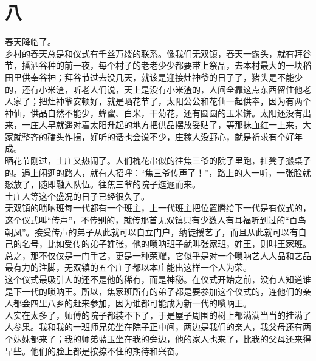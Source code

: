 \fancyhead[RO]{\thepage} %
\fancyhead[LE]{\thepage} %
\fancyfoot[LE,RO]{}
\fancyfoot[LO,CE]{}
\fancyfoot[CO,RE]{}
\chapter*{八}
春天降临了。\\

乡村的春天总是和仪式有千丝万缕的联系。像我们无双镇，春天一露头，就有拜谷节，播洒谷种的前一夜，每个村子的老老少少都要带上祭品，去本村最大的一块稻田里供奉谷神；拜谷节过去没几天，就该是迎接灶神爷的日子了，猪头是不能少的，还有小米渣，听老人们说，天上是没有小米渣的，人间全靠这点东西留住他老人家了；把灶神爷安顿好，就是晒花节了，太阳公公和花仙一起供奉，因为有两个神仙，供品自然不能少，蜂蜜、白米，干菊花，还有圆圆的玉米饼。太阳还没有出来，一庄人早就遥对着太阳升起的地方把供品摆放妥贴了，等那抹血红一上来，大家就整齐的磕头作揖，好听的话也会说不少，庄稼人没野心，就是祈求有个好年成。\\

晒花节刚过，土庄又热闹了。人们槐花串似的往焦三爷的院子里跑，扛凳子搬桌子的。遇上闲逛的路人，就有人招呼：“焦三爷传声了！”，路上的人一听，一张脸就怒放了，随即融入队伍。往焦三爷的院子迤逦而来。\\

土庄人等这个盛况的日子已经很久了。\\

无双镇的唢呐班每一代都有一个班主，上一代班主把位置腾给下一代是有仪式的，这个仪式叫“传声”，不传别的，就传那首无双镇只有少数人有耳福听到过的“百鸟朝凤”。接受传声的弟子从此就可以自立门户，纳徒授艺了，而且从此就可以有自己的名号，比如受传的弟子姓张，他的唢呐班子就叫张家班，姓王，则叫王家班。总之，那不仅仅是一门手艺，更是一种荣耀，它似乎是对一个唢呐艺人人品和艺品最有力的注脚，无双镇的五个庄子都以本庄能出这样一个人为荣。\\

这个仪式最吸引人的还不是他的稀有，而是神秘。在仪式开始之前，没有人知道谁是下一代的唢呐王。所以，焦家班所有的弟子都是要参加这个仪式的，连他们的亲人都会四里八乡的赶来参加，因为谁都可能成为新一代的唢呐王。\\

人实在太多了，师傅的院子都装不下了，于是屋子周围的树上都满满当当的挂满了人参果。我和我的一班师兄弟坐在院子正中间，两边是我们的亲人，我父母还有两个妹妹都来了；我的师弟蓝玉坐在我的旁边，他的家人也来了，比我的父母还来得早些。他们的脸上都是按捺不住的期待和兴奋。\\

